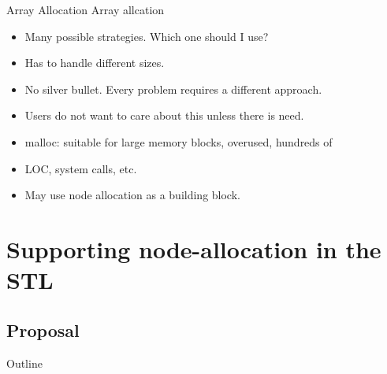 \documentclass[10pt,aspectratio=169]{beamer}
\begin{document}

\begin{frame}[fragile]{Array Allocation}
Array allcation
\begin{itemize}
\item Many possible strategies. Which one should I use?
\item Has to handle different sizes.
\item No silver bullet. Every problem requires a different approach.
\item Users do not want to care about this unless there is need.
\item malloc: suitable for large memory blocks, overused, hundreds of
\item LOC, system calls, etc.
\item May use node allocation as a building block.
\end{itemize}

\end{frame}

\section{Supporting node-allocation in the STL}
\subsection{Proposal}

\begin{frame}{Outline}
\end{frame}
\end{document}
